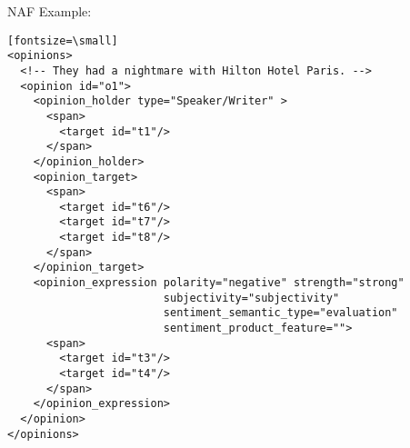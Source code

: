 


NAF Example:

\begin{verbatim}[fontsize=\small]
<opinions>
  <!-- They had a nightmare with Hilton Hotel Paris. -->
  <opinion id="o1">
    <opinion_holder type="Speaker/Writer" >
      <span>
        <target id="t1"/>
      </span>
    </opinion_holder>
    <opinion_target>
      <span>
        <target id="t6"/>
        <target id="t7"/>
        <target id="t8"/>
      </span>
    </opinion_target>
    <opinion_expression polarity="negative" strength="strong" 
                        subjectivity="subjectivity"
                        sentiment_semantic_type="evaluation"
                        sentiment_product_feature="">
      <span>
        <target id="t3"/>
        <target id="t4"/>
      </span>
    </opinion_expression>
  </opinion>
</opinions>
\end{verbatim}


